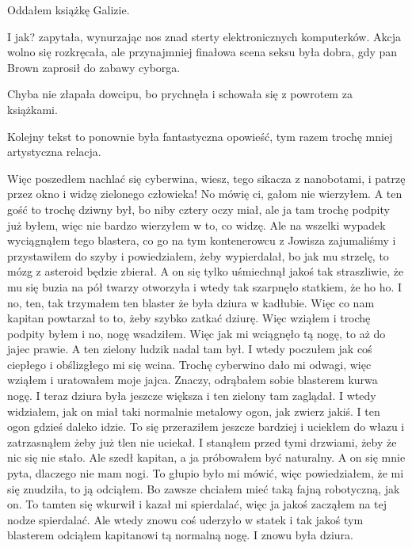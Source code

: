 Oddałem książkę Galizie.

\begin{dialogue}
	\ds{} I jak? \dm{} zapytała, wynurzając nos znad sterty elektronicznych komputerków.
	\ds{} Akcja wolno się rozkręcała, ale przynajmniej finałowa scena seksu była dobra, gdy pan Brown zaprosił do zabawy cyborga.
\end{dialogue}

Chyba nie złapała dowcipu, bo prychnęła i schowała się z powrotem za książkami.

Kolejny tekst to ponownie była fantastyczna opowieść, tym razem trochę mniej artystyczna relacja.

\begin{poem}
	Więc poszedłem nachlać się cyberwina, wiesz, tego sikacza z nanobotami, i patrzę przez okno i widzę zielonego człowieka!
	No mówię ci, gałom nie wierzyłem. A ten gość to trochę dziwny był, bo niby cztery oczy miał, ale ja tam trochę podpity już byłem, więc nie bardzo wierzyłem w to, co widzę.
	Ale na wszelki wypadek wyciągnąłem tego blastera, co go na tym kontenerowcu z Jowisza zajumaliśmy i przystawiłem do szyby i powiedziałem, żeby wypierdalał, bo jak mu strzelę, to mózg z asteroid będzie zbierał.
	A on się tylko uśmiechnął jakoś tak straszliwie, że mu się buzia na pół twarzy otworzyła i wtedy tak szarpnęło statkiem, że ho ho.
	I no, ten, tak trzymałem ten blaster że była dziura w kadłubie. Więc co nam kapitan powtarzał to to, żeby szybko zatkać dziurę.
	Więc wziąłem i trochę podpity byłem i no, nogę wsadziłem.
	Więc jak mi wciągnęło tą nogę, to aż do jajec prawie. A ten zielony ludzik nadal tam był. I wtedy poczułem jak coś ciepłego i obślizgłego mi się wcina.
	Trochę cyberwino dało mi odwagi, więc wziąłem i uratowałem moje jajca.
	Znaczy, odrąbałem sobie blasterem kurwa nogę. 
	I teraz dziura była jeszcze większa i ten zielony tam zaglądał.
	I wtedy widziałem, jak on miał taki normalnie metalowy ogon, jak zwierz jakiś. I ten ogon gdzieś daleko idzie.
	To się przeraziłem jeszcze bardziej i uciekłem do włazu i zatrzasnąłem żeby już tlen nie uciekał.
	I stanąłem przed tymi drzwiami, żeby że nic się nie stało. Ale szedł kapitan, a ja próbowałem być naturalny.
	A on się mnie pyta, dlaczego nie mam nogi.
	To głupio było mi mówić, więc powiedziałem, że mi się znudziła, to ją odciąłem. Bo zawsze chciałem mieć taką fajną robotyczną, jak on.
	To tamten się wkurwił i kazał mi spierdalać, więc ja jakoś zacząłem na tej nodze spierdalać.
	Ale wtedy znowu coś uderzyło w statek i tak jakoś tym blasterem odciąłem kapitanowi tą normalną nogę. I znowu była dziura.

\end{poem}
